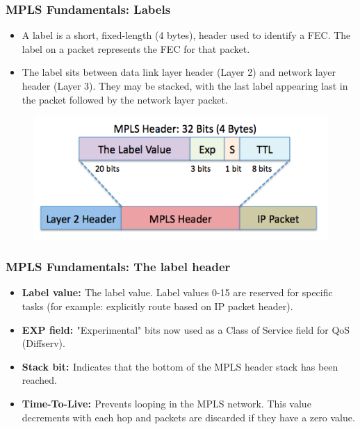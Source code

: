 \documentclass[12pt]{beamer}
\begin{document}
\begin{frame}
  \frametitle{MPLS Fundamentals: Labels}
  \begin{itemize}
    \item A label is a short, fixed-length (4 bytes), header used to identify a FEC. The label on a packet represents the FEC for that packet.
    \item The label sits between data link layer header (Layer 2) and network layer header (Layer 3). They may be stacked, with the last label appearing last in the packet followed by the network layer packet. 
  \end{itemize}
  \begin{figure}[h]
    \begin{center}
      \includegraphics[scale=0.40]{header_mpls.png}
    \end{center}
  \end{figure}    
\end{frame}

\begin{frame}
  \frametitle{MPLS Fundamentals: The label header}
    \begin{itemize}
      \item {\bf{Label value: }}The label value. Label values 0-15 are reserved for specific tasks (for example: explicitly route based on IP packet header).
      \item {\bf{EXP field: }}"Experimental" bits now used as a Class of Service field for QoS (Diffserv).
      \item {\bf{Stack bit: }}Indicates that the bottom of the MPLS header stack has been reached.
      \item {\bf{Time-To-Live: }}Prevents looping in the MPLS network. This value decrements with each hop and packets are discarded if they have a zero value.
    \end{itemize}       
\end{frame}
\end{document}
